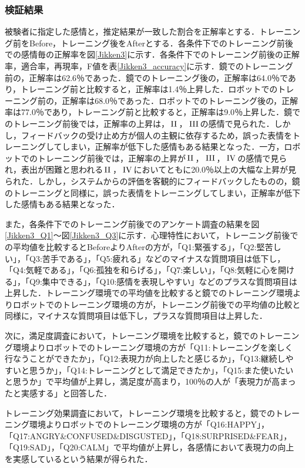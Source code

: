 \documentclass[titlepage]{jarticle}
\begin{document}
\subsubsection{検証結果}
被験者に指定した感情と，推定結果が一致した割合を正解率とする．トレーニング前をBefore，トレーニング後をAfterとする．各条件下でのトレーニング前後での感情毎の正解率を図\ref{Jikken3}に示す．各条件下でのトレーニング前後の正解率，適合率，再現率，F値を表\ref{Jikken3_accuracy}に示す．鏡でのトレーニング前の，正解率は62.6$％$であった．鏡でのトレーニング後の，正解率は64.0$％$であり，トレーニング前と比較すると，正解率は1.4$％$上昇した．ロボットでのトレーニング前の，正解率は68.0$％$であった．ロボットでのトレーニング後の，正解率は77.0$％$であり，トレーニング前と比較すると，正解率は9.0$％$上昇した．鏡でのトレーニング前後では，正解率の上昇は，$\rm\,II\,$，$\rm\,III\,$の感情で見られた．しかし，フィードバックの受け止め方が個人の主観に依存するため，誤った表情をトレーニングしてしまい，正解率が低下した感情もある結果となった．一方，ロボットでのトレーニング前後では，正解率の上昇が$\rm\,II\,$，$\rm\,III\,$，$\rm\,IV\,$の感情で見られ，表出が困難と思われる$\rm\,II\,$，$\rm\,IV\,$においてともに20.0$％$以上の大幅な上昇が見られた．しかし，システムからの評価を客観的にフィードバックしたものの，鏡のトレーニングと同様に，誤った表情をトレーニングしてしまい，正解率が低下した感情もある結果となった．

また，各条件下でのトレーニング前後でのアンケート調査の結果を図\ref{Jikken3_Q1}〜図\ref{Jikken3_Q3}に示す．心理特性において，トレーニング前後での平均値を比較するとBeforeよりAfterの方が，「Q1:緊張する」，「Q2:堅苦しい」，「Q3:苦手である」，「Q5:疲れる」などのマイナスな質問項目は低下し，「Q4:気軽である」，「Q6:孤独を和らげる」，「Q7:楽しい」，「Q8:気軽に心を開ける」，「Q9:集中できる」，「Q10:感情を表現しやすい」などのプラスな質問項目は上昇した．トレーニング環境での平均値を比較すると鏡でのトレーニング環境よりロボットでのトレーニング環境の方が，トレーニング前後での平均値の比較と同様に，マイナスな質問項目は低下し，プラスな質問項目は上昇した．

次に，満足度調査において，トレーニング環境を比較すると，鏡でのトレーニング環境よりロボットでのトレーニング環境の方が「Q11:トレーニングを楽しく行なうことができたか」，「Q12:表現力が向上したと感じるか」，「Q13:継続しやすいと思うか」，「Q14:トレーニングとして満足できたか」，「Q15:また使いたいと思うか」で平均値が上昇し，満足度が高まり，100$％$の人が「表現力が高まったと実感する」と回答した．

トレーニング効果調査において，トレーニング環境を比較すると，鏡でのトレーニング環境よりロボットでのトレーニング環境の方が「Q16:HAPPY」，「Q17:ANGRY\&CONFUSED\&DISGUSTED」，「Q18:SURPRISED\&FEAR」，「Q19:SAD」，「Q20:CALM」で平均値が上昇し，各感情において表現力の向上を実感しているという結果が得られた．
\end{document}
